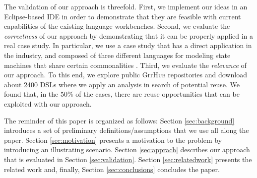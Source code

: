 The validation of our approach is threefold. First, we implement our ideas in an Eclipse-based IDE in order to demonstrate that they are feasible with current capabilities of the existing language workbenches. Second, we evaluate the \textit{correctness} of our approach by demonstrating that it can be properly applied in a real case study. In particular, we use a case study that has a direct application in the industry, and composed of three different languages for modeling state machines that share certain commonalities \cite{Crane:2007}. Third, we evaluate the \textit{relevance} of our approach. To this end, we explore public \textsc{GitHub} repositories and download about 2400 DSLs where we apply an analysis in search of potential reuse. We found that, in the 50\% of the cases, there are reuse opportunities that can be exploited with our approach. %

The reminder of this paper is organized as follows: Section \ref{sec:background} introduces a set of preliminary definitions/assumptions that we use all along the paper. Section \ref{sec:motivation} presents a motivation to the problem by introducing an illustrating scenario. Section \ref{sec:apprach} describes our approach that is evaluated in Section \ref{sec:validation}. Section \ref{sec:relatedwork} presents the related work and, finally, Section \ref{sec:conclusions} concludes the paper. 



